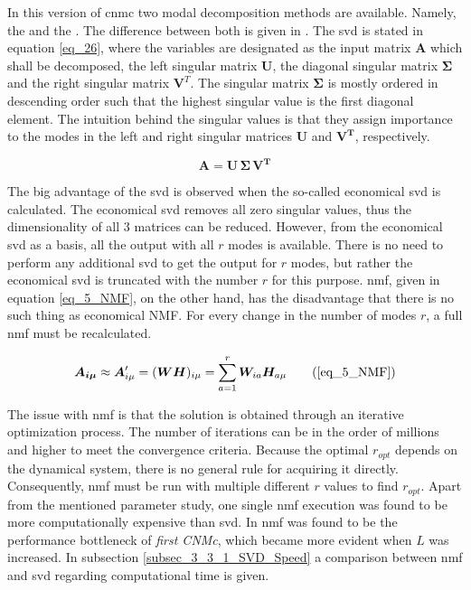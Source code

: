 In this version of \gls{cnmc} two modal decomposition methods are available.
Namely, the  and the .
The difference between both is given in \cite{Lee1999}.
The \gls{svd} is stated in equation \eqref{eq_26}, where the variables are designated as the input matrix $\bm A$ which shall be decomposed, the left singular matrix $ \bm U $, the diagonal singular matrix $ \bm \Sigma $ and the right singular matrix $ \bm V^T $.
The singular matrix $ \bm \Sigma $ is mostly ordered in descending order such that the highest singular value is the first diagonal element. 
The intuition behind the singular values is that they assign importance to the modes in the left and right singular matrices $ \bm U $ and $ \bm {V^T} $, respectively. 

\begin{equation}
    \bm A = \bm U \, \bm \Sigma \, \bm {V^T}
    \label{eq_26}
\end{equation}


The big advantage of the \gls{svd} is observed when the so-called economical \gls{svd} is calculated. 
The economical \gls{svd} removes all zero singular values, thus the dimensionality of all 3 matrices can be reduced. 
However, from the economical \gls{svd} as a basis, all the output with all $r$ modes is available.
There is no need to perform any additional \gls{svd} to get the output for $r$ modes, but rather the economical \gls{svd} is truncated with the number $r$ for this purpose.
\gls{nmf}, given in equation \eqref{eq_5_NMF}, on the other hand, has the disadvantage that there is no such thing as economical NMF. 
For every change in the number of modes $r$, a full \gls{nmf} must be recalculated.\newline

\begin{equation}
    \bm {A_{i \mu}} \approx \bm A^{\prime}_{i \mu}  = (\bm W  \bm H)_{i \mu}  = \sum_{a = 1}^{r} 
    \bm W_{ia} \bm H_{a \mu}
    \tag{\ref{eq_5_NMF}}
\end{equation}


The issue with \gls{nmf} is that the solution is obtained through an iterative optimization process. 
The number of iterations can be in the order of millions and higher to meet the convergence criteria.
Because the optimal $r_{opt}$ depends on the dynamical system, there is no general rule for acquiring it directly. 
Consequently, \gls{nmf} must be run with multiple different $r$ values to find $r_{opt}$. 
Apart from the mentioned parameter study, one single \gls{nmf} execution was found to be more computationally expensive than \gls{svd}. 
In \cite{Max2021} \gls{nmf} was found to be the performance bottleneck of \emph{first CNMc}, which became more evident when $L$ was increased.
In subsection 
\ref{subsec_3_3_1_SVD_Speed}
a comparison between \gls{nmf} and \gls{svd} regarding computational time is given.\newline


